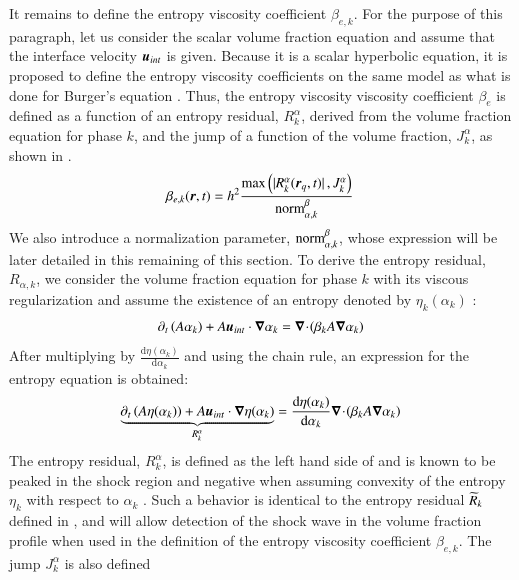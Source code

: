 \documentclass[preprint,10pt]{elsarticle}
\begin{document}
It remains to define the entropy viscosity coefficient $\beta_{e,k}$. For the purpose of this paragraph, let us consider the scalar volume fraction equation and 
assume that the interface 
velocity $\boldsymbol u_{int}$ is given. Because it is a scalar hyperbolic equation, it is proposed to define the entropy viscosity coefficients on the same model as 
what is done for Burger's equation 
\cite{jlg1, jlg2}. Thus, the entropy viscosity viscosity coefficient $\beta_e$ is defined as a function of an entropy residual, $R_{k}^\alpha$, derived from the 
volume fraction equation for 
phase $k$, and the jump of a function of the volume fraction, $J_k^\alpha$, as shown in .
%
\begin{align}\label{eq:def-beta-sen-sect4}
\beta_{e,k}( \boldsymbol r, t) = h^2 \frac{\max\left( | R_{k}^\alpha(\boldsymbol r_q,t) |\,,  J_k^\alpha \right)}{\textrm{norm}_{\alpha, k}^\beta} \,
\end{align}
%
We also introduce a normalization parameter, $\textrm{norm}_{\alpha,k}^\beta$, whose expression will be later detailed in this remaining of this section. To derive the 
entropy residual, $R_{\alpha,k}$, 
we consider the volume fraction equation for phase $k$ with its viscous regularization and assume the existence of an entropy denoted by $\eta_k(\alpha_k)$ 
\cite{Leveque}:
%
\begin{equation}\label{eq:vf-sem-sct4}
\partial_t \left(A \alpha_k \right) + A \boldsymbol u_{int} \cdot \boldsymbol\nabla \alpha_k = \boldsymbol\nabla\! \cdot \! \left( \beta_k A \boldsymbol\nabla \alpha_k \right)
\end{equation}
% 
After multiplying by $\frac{\text{d} \eta (\alpha_k)}{\text{d} \alpha_k}$ and using the chain rule, an expression for the entropy equation is obtained:
%
\begin{equation}\label{eq:vf-sem2-sct4}
\underbrace{\partial_t \left(A \eta(\alpha_k) \right) + A \boldsymbol u_{int} \cdot \boldsymbol\nabla \eta(\alpha_k)}_{R_{k}^\alpha} = \frac{\text{d} \eta (\alpha_k)}{\text{d} \alpha_k} 
\boldsymbol\nabla\! \cdot \! \left( \beta_k A \boldsymbol\nabla \alpha_k \right)
\end{equation}
% 
The entropy residual, $R_{k}^\alpha$, is defined as the left hand side of  and is known to be peaked in the shock region and negative 
when assuming convexity of the 
entropy $\eta_k$ with respect to $\alpha_k$ \cite{Leveque}. Such a behavior is identical to the entropy residual $\widetilde{R}_k$ defined in , 
and will allow detection of the 
shock wave in the volume fraction profile when used in the definition of the entropy viscosity coefficient $\beta_{e,k}$. The jump $J_k^\alpha$ is also defined 
\end{document}
